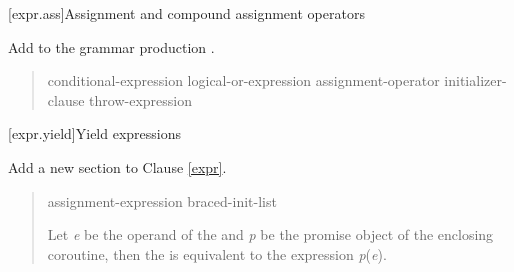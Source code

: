 \setcounter{section}{17}
[expr.ass]{Assignment and compound assignment operators}%

Add  to the grammar production .

\begin{quote}
\begin{bnf}
  \br
  conditional-expression\br
  logical-or-expression assignment-operator initializer-clause\br
  throw-expression \br
\end{bnf}
\end{quote}

\setcounter{section}{20}
[expr.yield]{Yield expressions}%

Add a new section to Clause \ref{expr}.

\begin{quote}
\begin{bnf}
  \br
   assignment-expression\br
   braced-init-list
\end{bnf}

\pnum
  Let \textit{e} be the operand of the  and \textit{p} be the promise object of the enclosing coroutine, then the  is equivalent to the expression  \textit{p}(\textit{e}).

%  
%
%
%


\end{quote}

